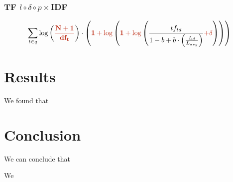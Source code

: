 \subsubsection{TF $l\circ\delta\circ p\times$IDF}

\begin{equation}
	\sum_{t\in q}\log\left(\mathbf{\begingroup\color{ruhuisstijlrood}\frac{N+1}{df_t}\endgroup}\right)\cdot\left(\mathbf{\begingroup\color{ruhuisstijlrood}1+\log\endgroup}\left(\mathbf{\begingroup\color{ruhuisstijlrood}1+\log\endgroup}\left(\frac{tf_{td}}{1-b+b\cdot\left(\frac{L_d}{L_{avg}}\right)}\mathbf{\begingroup\color{ruhuisstijlrood}+\delta\endgroup}\right)\right)\right)
\end{equation}

\section{Results}
We found that 

\section{Conclusion}
We can conclude that

We \cite{Kamphuis2020BM25}